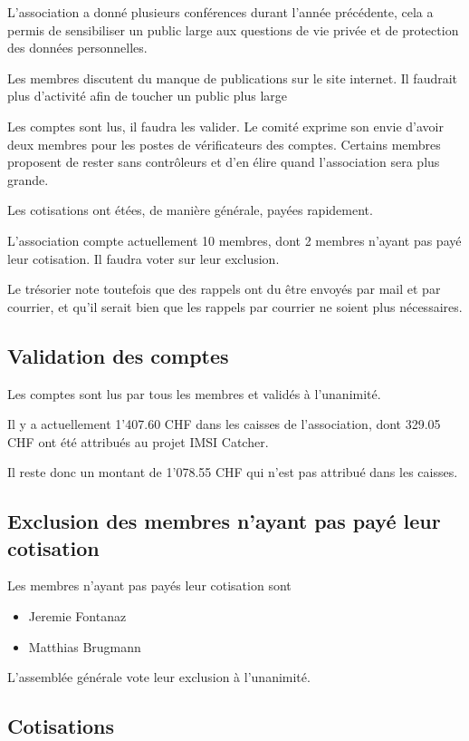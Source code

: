 \documentclass[12pt,twoside]{report}
\begin{document}
L'association a donné plusieurs conférences durant l'année précédente, cela a permis de sensibiliser un public large aux questions de vie privée et de protection des données personnelles.

Les membres discutent du manque de publications sur le site internet. Il faudrait plus d'activité afin de toucher un public plus large

Les comptes sont lus, il faudra les valider. Le comité exprime son envie d'avoir deux membres pour les postes de vérificateurs des comptes. Certains membres proposent de rester sans contrôleurs et d'en élire quand l'association sera plus grande.

Les cotisations ont étées, de manière générale, payées rapidement. 

L'association compte actuellement 10 membres, dont 2 membres n'ayant pas payé leur cotisation. Il faudra voter sur leur exclusion.

Le trésorier note toutefois que des rappels ont du être envoyés par mail et par courrier, et qu'il serait bien que les rappels par courrier ne soient plus nécessaires.


\subsection*{Validation des comptes}

Les comptes sont lus par tous les membres et validés à l'unanimité.

Il y a actuellement 1'407.60 CHF dans les caisses de l'association, dont 329.05 CHF ont été attribués au projet IMSI Catcher.

Il reste donc un montant de 1'078.55 CHF qui n'est pas attribué dans les caisses.


\subsection*{Exclusion des membres n'ayant pas payé leur cotisation}

Les membres n'ayant pas payés leur cotisation sont

\begin{itemize}
\item{Jeremie Fontanaz}
\item{Matthias Brugmann}
\end{itemize}

L'assemblée générale vote leur exclusion à l'unanimité.

\subsection*{Cotisations}
\end{document}
